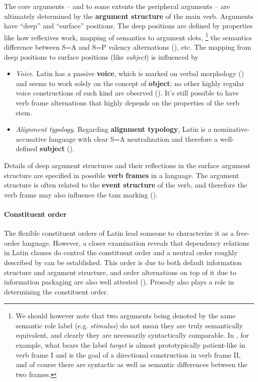 \documentclass[a4paper, oneside, 12pt]{report}
\newcommand*{\citesec}[1]{\S~{#1}}
\newcommand*{\concept}[1]{\textbf{#1}}
\newcommand*{\term}[1]{\emph{#1}}
\newcommand*{\category}[1]{\textsc{#1}}
\begin{document}
The core arguments -- and to some extents the peripheral arguments --
are ultimately determined by the \concept{argument structure} of the main verb.
Arguments have ``deep'' and ``surface'' positions.
The deep positions are defined by properties like  
how reflexives work, mapping of semantics to argument slots,%
\footnote{
    We should however note that 
    two arguments being denoted by the same semantic role label 
    (e.g. \term{stimulus})
    do not mean they are truly semantically equivalent,
    and clearly they are necessarily syntactically comparable.
    In \citet[\citesec{4.2}]{dixon2005semantic}, for example,
    what bears the label \term{target}
    is almost prototypically patient-like in verb frame I
    and is the goal of a directional construction in verb frame II,
    and of course there are syntactic as well as semantic differences between the two frames.
}
the semantics difference between S=A and S=P valency alternations 
(), etc.
The mapping from deep positions to surface positions
(like \term{subject}) is influenced by
\begin{itemize}
    \item \emph{Voice}. Latin has a passive \concept{voice},
    which is marked on verbal morphology ()
    and seems to work solely on the concept of \concept{object};
    no other highly regular voice constructions of such kind are observed
    ().
    It's still possible to have verb frame alternations
    that highly depends on the properties of the verb stem.
    \item \emph{Alignment typology}. 
    Regarding \concept{alignment typology},
    Latin is a nominative-accusative language
    with clear \category{S}=\category{A} neutralization 
    and therefore a well-defined \concept{subject} ().
\end{itemize}


Details of deep argument structures and their reflections in the surface argument structure 
are specified in possible \concept{verb frames} in a language.
The argument structure is often related to the \concept{event structure} of the verb,
and therefore the verb frame may also influence the \ac{tam} marking
().


\paragraph*{Constituent order}
The flexible constituent orders of Latin 
lead someone to characterize it as a free-order language.
However, a closer examination reveals that 
dependency relations in Latin clauses do control the constituent order
and a neutral order roughly described by  can be established.
This order is due to both default information structure 
and argument structure,
and order alternations on top of it
due to information packaging are also well attested 
().
Prosody also plays a role in determining the constituent order.
\end{document}
